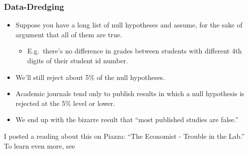 \documentclass[handout]{beamer}
\begin{document}

\begin{frame}
\frametitle{Data-Dredging}
\begin{itemize}
	\item Suppose you have a long list of null hypotheses and assume, for the sake of argument that all of them are true.
		\begin{itemize}
			\item E.g.\ there's no difference in grades between students with different 4th digits of their student id number. 
		\end{itemize}
	\item We'll still reject about 5\% of the null hypotheses.
	\item Academic journals tend only to publish results in which a null hypothesis is rejected at the 5\% level or lower. 
	\item We end up with the bizarre result that ``most published studies are false.''  
\end{itemize}


\alert{I posted a reading about this on Piazza: ``The Economist - Trouble in the Lab.'' To learn even more, see \href{http://www.plosmedicine.org/article/info:doi/10.1371/journal.pmed.0020124}{\textcolor{blue}{}}}


\end{frame}
\end{document}
